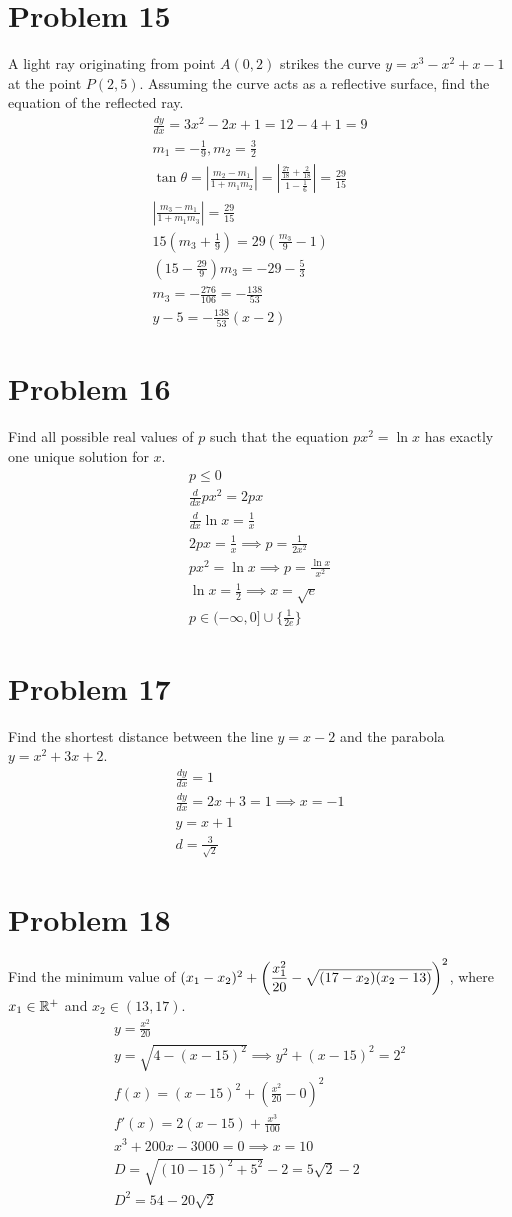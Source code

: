 \documentclass[12pt]{article}
\newcommand*{\paren}[1]{\ensuremath\left(#1\right)}
\newcommand{\dydx}{\frac{dy}{dx}}
\newcommand*{\real}{\ensuremath\mathbb{R}}
\newcommand{\problem}[1]{\section{Problem #1}}
\begin{document}
\problem{15}
A light ray originating from point $A(0, 2)$ strikes the curve $y = x^3 - x^2 + x - 1$ at the point $P (2, 5)$. Assuming the curve acts as a reflective surface, find the equation of the reflected ray.
\begin{gather*}
    \dydx =3x^2-2x+1 =12-4+1=9\\
    m_1=-\frac{1}{9}, m_2=\frac{3}{2}\\
    \tan \theta =|\frac{m_2-m_1}{1+m_1m_2}|=|\frac{\frac{27}{18}+\frac{2}{18}}{1-\frac{1}{6}}|=\frac{29}{15}\\
    |\frac{m_3-m_1}{1+m_1m_3}|=\frac{29}{15}\\
    15(m_3+\frac{1}{9})=29(\frac{m_3}{9}-1)\\
    (15-\frac{29}{9})m_3=-29-\frac{5}{3}\\
    m_3=-\frac{276}{106}=-\frac{138}{53}\\
    \boxed{y-5=-\frac{138}{53}(x-2)}
\end{gather*}

\problem{16}
Find all possible real values of $p$ such that the equation $px^2 = \ln x$ has exactly one unique solution for $x$.
\begin{gather*}
    p \le 0\\
    \frac{d}{dx}px^2=2px\\
    \frac{d}{dx}\ln x=\frac{1}{x}\\
    2px=\frac{1}{x} \implies p=\frac{1}{2x^2}\\
    px^2=\ln x \implies p=\frac{\ln x}{x^2}\\
    \ln x = \frac{1}{2}\implies x = \sqrt{e}\\
    \boxed{p\in (-\infty, 0] \cup \{\frac{1}{2e}\}}
\end{gather*}

\problem{17}
Find the shortest distance between the line $y = x - 2$ and the parabola $y = x^2 + 3x + 2$.
\begin{gather*}
    \dydx = 1\\
    \dydx =2x+3=1 \implies x=-1\\
    y=x+1\\
    \boxed{d=\frac{3}{\sqrt{2}}}
\end{gather*}

\problem{18}
Find the minimum value of $(x_1 -x_2)^2 + \paren{\dfrac{x_1^2}{20} - \sqrt{(17 - x_2)(x_2 - 13)}}^2$, where $x_1 \in  \real^+ $ and $x_2 \in (13, 17)$.
\begin{gather*}
    y=\frac{x^2}{20}\\
    y=\sqrt{4-(x-15)^2} \implies y^2+(x-15)^2=2^2\\
    f(x)=(x-15)^2+(\frac{x^2}{20}-0)^2\\
    f'(x)=2(x-15)+\frac{x^3}{100}\\
    x^3+200x-3000=0 \implies x=10\\
    D=\sqrt{(10-15)^2+5^2}-2=5\sqrt{2}-2\\
    \boxed{D^2=54-20\sqrt{2}}
\end{gather*}
\end{document}
